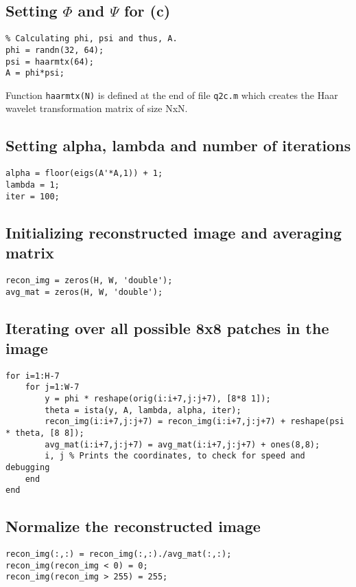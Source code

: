 \documentclass[fleqn, 11pt]{article}
\begin{document}
\subsection*{Setting $\Phi$ and $\Psi$ for (c)}
\begin{verbatim}
% Calculating phi, psi and thus, A.
phi = randn(32, 64);
psi = haarmtx(64);
A = phi*psi;
\end{verbatim}
Function \texttt{haarmtx(N)} is defined at the end of file \texttt{q2c.m} which creates the Haar wavelet transformation matrix of size NxN.\\

\subsection*{Setting alpha, lambda and number of iterations}
\begin{verbatim}
alpha = floor(eigs(A'*A,1)) + 1;
lambda = 1;
iter = 100;
\end{verbatim}

\subsection*{Initializing reconstructed image and averaging matrix}
\begin{verbatim}
recon_img = zeros(H, W, 'double');
avg_mat = zeros(H, W, 'double');
\end{verbatim}

\subsection*{Iterating over all possible 8x8 patches in the image}
\begin{verbatim}
for i=1:H-7
    for j=1:W-7
        y = phi * reshape(orig(i:i+7,j:j+7), [8*8 1]);
        theta = ista(y, A, lambda, alpha, iter);
        recon_img(i:i+7,j:j+7) = recon_img(i:i+7,j:j+7) + reshape(psi * theta, [8 8]);
        avg_mat(i:i+7,j:j+7) = avg_mat(i:i+7,j:j+7) + ones(8,8);
        i, j % Prints the coordinates, to check for speed and debugging
    end
end
\end{verbatim}

\subsection*{Normalize the reconstructed image}
\begin{verbatim}
recon_img(:,:) = recon_img(:,:)./avg_mat(:,:);
recon_img(recon_img < 0) = 0;
recon_img(recon_img > 255) = 255;
\end{verbatim}
\end{document}

